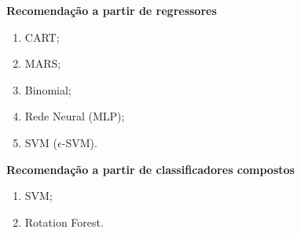 \begin{frame}
	\begin{block}{}
		\textbf{Recomendação a partir de regressores}
		\begin{enumerate}
			\item CART;
			\item MARS;
			\item Binomial;
			\item Rede Neural (MLP);
			\item SVM (\(\epsilon\)-SVM).		
		\end{enumerate}
	\end{block}
\end{frame}

\begin{frame}
	\begin{block}{}
		\textbf{Recomendação a partir de classificadores compostos}
		\begin{enumerate}
			\item SVM;
			\item Rotation Forest.		
		\end{enumerate}
	\end{block}
\end{frame}

